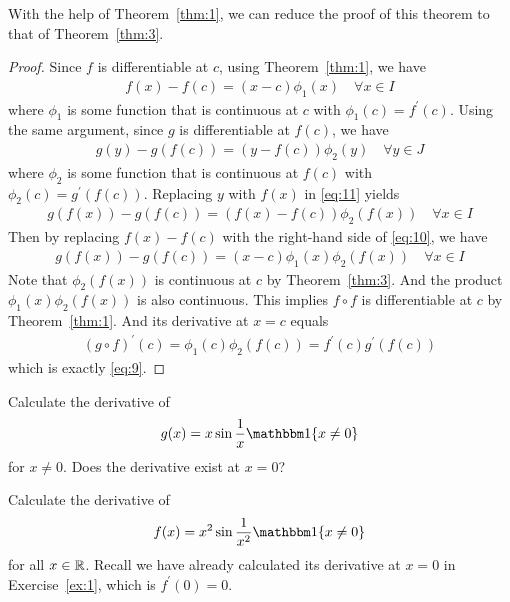 \documentclass[thmcnt=section, 12pt]{my-elegantbook}
\begin{document}
With the help of Theorem~\ref{thm:1}, 
we can reduce the proof of this theorem 
to that of Theorem~\ref{thm:3}.

\begin{proof}
    Since $f$ is differentiable at $c$, using Theorem~\ref{thm:1}, we have 
    \begin{align}
        f(x) - f(c) = (x-c) \phi_1(x)
        \quad \forall x \in I
        \label{eq:10}
    \end{align}
    where $\phi_1$ is some function 
	that is continuous at $c$ 
	with $\phi_1(c) = f^\prime(c)$. 
	Using the same argument, 
	since $g$ is differentiable at $f(c)$, 
	we have 
    \begin{align}
        g(y) - g(f(c)) = (y-f(c)) \phi_2(y)
        \quad \forall y \in J
        \label{eq:11}
    \end{align}
    where $\phi_2$ is some function that is continuous at $f(c)$ 
	with $\phi_2(c) = g^\prime(f(c))$. 
	Replacing $y$ with $f(x)$ in \eqref{eq:11} yields 
    \begin{align*}
        g(f(x)) - g(f(c)) = (f(x)-f(c)) \phi_2(f(x))
        \quad \forall x \in I
    \end{align*}
    Then by replacing $f(x)-f(c)$ 
	with the right-hand side of \eqref{eq:10}, 
	we have 
    \begin{align*}
        g(f(x)) - g(f(c)) = (x-c) \phi_1(x) \phi_2(f(x))
        \quad \forall x \in I
    \end{align*}
    Note that $\phi_2(f(x))$ is continuous at $c$ 
	by Theorem~\ref{thm:3}. 
	And the product $\phi_1(x) \phi_2(f(x))$ is also continuous. 
	This implies $f \circ f$ is differentiable at $c$ 
	by Theorem~\ref{thm:1}. And its derivative at $x = c$ equals
    \begin{align*}
        (g \circ f)^\prime(c)
        = \phi_1(c) \phi_2(f(c))
        = f^\prime(c) g^\prime(f(c))
    \end{align*}
    which is exactly \eqref{eq:9}.
\end{proof}

\begin{exercise}
    Calculate the derivative of
    \begin{align*}
        g(x) = x \sin \frac{1}{x} \ind\{x \neq 0\}
    \end{align*}
    for $x \neq 0$. Does the derivative exist at $x = 0$?
    \label{ex:2}
\end{exercise}

\begin{exercise}
    Calculate the derivative of 
    \begin{align*}
        f(x) = x^2 \sin \frac{1}{x^2} \ind\{x \neq 0\}
    \end{align*}
    for all $x \in \mathbb{R}$. Recall we have already calculated its derivative at $x = 0$ in Exercise~\ref{ex:1}, which is $f^\prime(0) = 0$.

    \label{ex:3}
\end{exercise}
\end{document}
